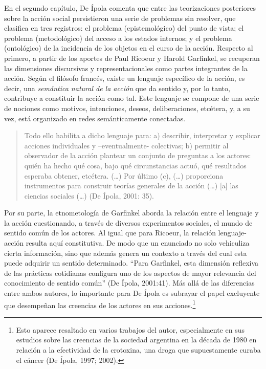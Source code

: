En el segundo capítulo, De Ípola comenta que entre las teorizaciones posteriores sobre la acción social persistieron una serie de problemas sin resolver, que clasifica en tres registros: el problema (epistemológico) del punto de vista; el problema (metodológico) del acceso a los estados internos; y el problema (ontológico) de la incidencia de los objetos en el curso de la acción. Respecto al primero, a partir de los aportes de Paul Ricoeur y Harold Garfinkel, se recuperan las dimensiones discursivas y representacionales como partes integrantes de la acción. Según el filósofo francés, existe un lenguaje específico de la acción, es decir, una \emph{semántica natural de la acción} que da sentido y, por lo tanto, contribuye a constituir la acción como tal. Este lenguaje se compone de una serie de nociones como motivos, intenciones, deseos, deliberaciones, etcétera, y, a su vez, está organizado en redes semánticamente conectadas.

\begin{quote}
Todo ello habilita a dicho lenguaje para: a) describir, interpretar y explicar acciones individuales y --eventualmente- colectivas; b) permitir al observador de la acción plantear un conjunto de preguntas a los actores: quién ha hecho qué cosa, bajo qué circunstancias actuó, qué resultados esperaba obtener, etcétera. (\dots) Por último (c), (\dots) proporciona instrumentos para construir teorías generales de la acción (\dots) [a] las ciencias sociales (\dots) (De Ípola, 2001: 35).
\end{quote}

Por su parte, la etnometología de Garfinkel aborda la relación entre el lenguaje y la acción cuestionando, a través de diversos experimentos sociales, el mundo de sentido común de los actores. Al igual que para Ricoeur, la relación lenguaje-acción resulta aquí constitutiva. De modo que un enunciado no solo vehiculiza cierta información, sino que además genera un contexto a través del cual esta puede adquirir un sentido determinado. \enquote{Para Garfinkel, esta dimensión reflexiva de las prácticas cotidianas configura uno de los aspectos de mayor relevancia del conocimiento de sentido común} (De Ípola, 2001:41). Más allá de las diferencias entre ambos autores, lo importante para De Ípola es subrayar el papel excluyente que desempeñan las creencias de los actores en sus acciones.\footnote{Esto aparece resaltado en varios trabajos del autor, especialmente en sus estudios sobre las creencias de la sociedad argentina en la década de 1980 en relación a la efectividad de la crotoxina, una droga que supuestamente curaba el cáncer (De Ípola, 1997; 2002).}

